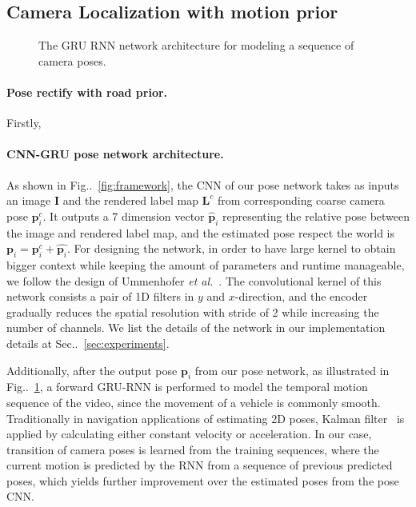 \documentclass[10pt,twocolumn,letterpaper]{article}
\makeatletter
\newcommand{\figref}[1]{Fig\onedot~\ref{#1}}
\newcommand{\secref}[1]{Sec\onedot~\ref{#1}}
\newcommand{\ve}[1]{{\mathbf #1}} %
\DeclareRobustCommand\onedot{\futurelet\@let@token\@onedot}
\def\onedot{\ifx\@let@token.\else.\null\fi\xspace}
\def\etal{\emph{et al.}}
\makeatother
\begin{document}
\subsection{Camera Localization with motion prior}

\begin{figure}[t]
\begin{center}
\fbox{\rule{0pt}{2in} \rule{0.9\linewidth}{0pt}}
\end{center}
   \caption{The GRU RNN network architecture for modeling a sequence of camera poses.}
\label{fig:rnn}
\end{figure}

\paragraph{Pose rectify with road prior.} Firstly, 

\paragraph{CNN-GRU pose network architecture.} 
As shown in \figref{fig:framework}, the CNN of our pose network takes as inputs an image $\ve{I}$ and the rendered label map $\ve{L}^c$ from corresponding coarse camera pose $\ve{p}_i^c$. It outputs a 7 dimension vector $\hat{\ve{p}}_i$ representing the relative pose between the image and rendered label map, and the estimated pose respect the world is $\ve{p}_i = \ve{p}_i^c + \hat{\ve{p}_i}$.
For designing the network, in order to have large kernel to obtain bigger context while keeping the amount of parameters and runtime manageable, we follow the design of Ummenhofer \etal~\cite{ummenhofer2016demon}. The convolutional kernel of this network consists a pair of 1D filters in $y$ and $x$-direction, and the encoder gradually reduces the spatial resolution with stride of 2 while increasing the number of channels. We list the details of the network in our implementation details at \secref{sec:experiments}.

Additionally, after the output pose $\ve{p}_i$ from our pose network, as illustrated in \figref{fig:rnn}, a forward GRU-RNN is performed to model the temporal motion sequence of the video, since the movement of a vehicle is commonly smooth.
Traditionally in navigation applications of estimating 2D poses,  Kalman filter~\cite{kalman1960new} is applied by calculating either constant velocity or acceleration. 
In our case, transition of camera poses is learned from the training sequences, where the current motion is predicted by the RNN from a sequence of previous predicted poses, which yields further improvement over the estimated poses from the pose CNN.
\end{document}
